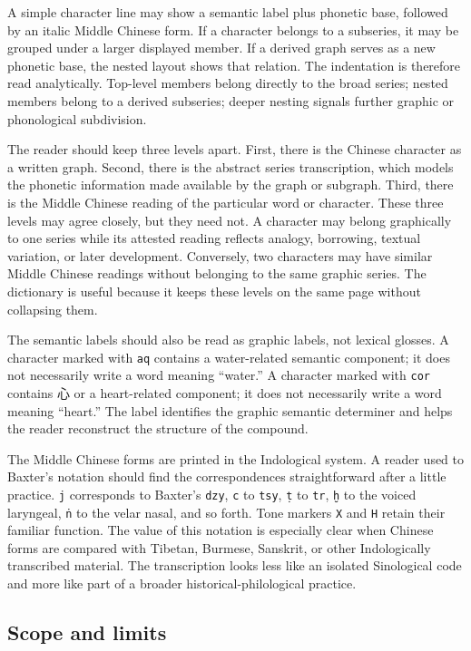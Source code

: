 A simple character line may show a semantic label plus phonetic base, followed by an italic Middle Chinese form. If a character belongs to a subseries, it may be grouped under a larger displayed member. If a derived graph serves as a new phonetic base, the nested layout shows that relation. The indentation is therefore read analytically. Top-level members belong directly to the broad series; nested members belong to a derived subseries; deeper nesting signals further graphic or phonological subdivision.

The reader should keep three levels apart. First, there is the Chinese character as a written graph. Second, there is the abstract series transcription, which models the phonetic information made available by the graph or subgraph. Third, there is the Middle Chinese reading of the particular word or character. These three levels may agree closely, but they need not. A character may belong graphically to one series while its attested reading reflects analogy, borrowing, textual variation, or later development. Conversely, two characters may have similar Middle Chinese readings without belonging to the same graphic series. The dictionary is useful because it keeps these levels on the same page without collapsing them.

The semantic labels should also be read as graphic labels, not lexical glosses. A character marked with \texttt{aq} contains a water-related semantic component; it does not necessarily write a word meaning ``water.'' A character marked with \texttt{cor} contains 心 or a heart-related component; it does not necessarily write a word meaning ``heart.'' The label identifies the graphic semantic determiner and helps the reader reconstruct the structure of the compound.

The Middle Chinese forms are printed in the Indological system. A reader used to Baxter's notation should find the correspondences straightforward after a little practice. \texttt{j} corresponds to Baxter's \texttt{dzy}, \texttt{c} to \texttt{tsy}, \texttt{ṭ} to \texttt{tr}, \texttt{ḫ} to the voiced laryngeal, \texttt{ṅ} to the velar nasal, and so forth. Tone markers \texttt{X} and \texttt{H} retain their familiar function. The value of this notation is especially clear when Chinese forms are compared with Tibetan, Burmese, Sanskrit, or other Indologically transcribed material. The transcription looks less like an isolated Sinological code and more like part of a broader historical-philological practice.

\subsection*{Scope and limits}

